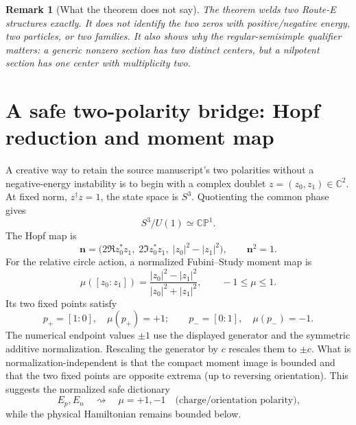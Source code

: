 \documentclass[11pt]{article}
\numberwithin{equation}{section}
\newcommand{\CP}{\mathbb{CP}}
\newtheorem{remark}[theorem]{Remark}
\begin{document}
\begin{remark}[What the theorem does not say]
The theorem welds two Route-E structures exactly.  It does not identify the
two zeros with positive/negative energy, two particles, or two families.  It
also shows why the regular-semisimple qualifier matters: a generic nonzero
section has two distinct centers, but a nilpotent section has one center with
multiplicity two.
\end{remark}

\section{A safe two-polarity bridge: Hopf reduction and moment map}

A creative way to retain the source manuscript's two polarities without a
negative-energy instability is to begin with a complex doublet
\(z=(z_0,z_1)\in\mathbb C^2\).  At fixed norm, \(z^\dagger z=1\), the state
space is \(S^3\).  Quotienting the common phase gives
\begin{equation}
 S^3/U(1)\simeq\CP^1.
 \label{eq:Hopfquotient}
\end{equation}
The Hopf map is
\begin{equation}
 \bm n=\bigl(2\Re z_0^*z_1,\;2\Im z_0^*z_1,\;
 |z_0|^2-|z_1|^2\bigr),\qquad \bm n^2=1.
 \label{eq:Hopfmap}
\end{equation}
For the relative circle action, a normalized Fubini--Study moment map is
\begin{equation}
 \mu([z_0:z_1])=
 \frac{|z_0|^2-|z_1|^2}{|z_0|^2+|z_1|^2},
 \qquad -1\le\mu\le1.
 \label{eq:momentmap}
\end{equation}
Its two fixed points satisfy
\begin{equation}
 p_+=[1:0],\quad\mu(p_+)=+1;
 \qquad p_-=[0:1],\quad\mu(p_-)=-1.
\end{equation}
The numerical endpoint values \(\pm1\) use the displayed generator and the
symmetric additive normalization.  Rescaling the generator by \(c\) rescales
them to \(\pm c\).  What is normalization-independent is that the compact
moment image is bounded and that the two fixed points are opposite extrema
(up to reversing orientation).  This suggests the normalized safe dictionary
\begin{equation}
 E_p,E_n\quad\rightsquigarrow\quad\mu=+1,-1
 \quad\text{(charge/orientation polarity),}
 \label{eq:safesign}
\end{equation}
while the physical Hamiltonian remains bounded below.
\end{document}
